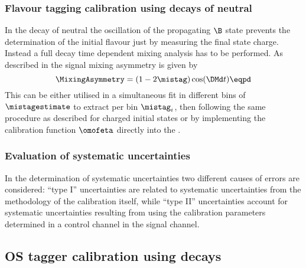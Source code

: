 \subsubsection{Flavour tagging calibration using decays of neutral \Bmesons}
\label{sec:flavour_tagging:calibration:method:neutral}

In the decay of neutral \Bmesons the oscillation of the propagating $\B$ state
prevents the determination of the initial flavour just by measuring the final
state charge. Instead a full decay time dependent mixing analysis has to be
performed. As described \eg in \cite{Aaij:2012nt} the signal mixing asymmetry is
given by
%
\begin{equation}
  \MixingAsymmetry = (1 - 2\mistag)\cos(\DMd t)\eqpd
\end{equation}
%
This can be either utilised in a simultaneous fit in different bins of
$\mistagestimate$ to extract per bin $\mistag_i$, then following the same
procedure as described for charged initial states or by implementing the
calibration function $\omofeta$ directly into the \PDF.

\subsubsection{Evaluation of systematic uncertainties}
\label{sec:flavour_tagging:calibration:method:systematics}

In the determination of systematic uncertainties two different causes of errors
are considered: \enquote{type I} uncertainties are related to systematic
uncertainties from the methodology of the calibration itself, while
\enquote{type II} uncertainties account for systematic uncertainties resulting
from using the calibration parameters determined in a control channel in the
signal channel.

\subsection[
  head={\ac{OS} tagger calibration using \BuToJpsiK decays},
  tocentry={\ac{OS} tagger calibration using \BuToJpsiKHyperref decays}
]{\ac{OS} tagger calibration using \BuToJpsiKbfsf decays}
\label{sec:flavour_tagging:calibration:os}

